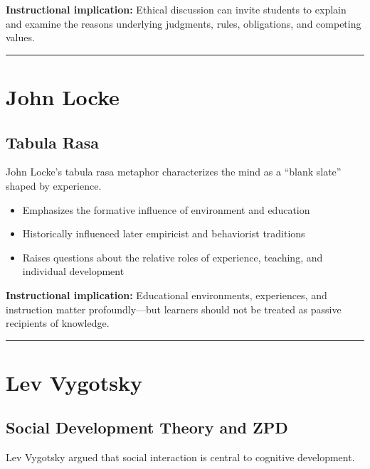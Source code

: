 \documentclass[
  letterpaper,
  DIV=11,
  numbers=noendperiod]{scrartcl}
\providecommand{\tightlist}{%
  \setlength{\itemsep}{0pt}\setlength{\parskip}{0pt}}\usepackage{longtable,booktabs,array}
\begin{document}
\textbf{Instructional implication:} Ethical discussion can invite
students to explain and examine the reasons underlying judgments, rules,
obligations, and competing values.

\begin{center}\rule{0.5\linewidth}{0.5pt}\end{center}

\section{John Locke}\label{john-locke}

\subsection{Tabula Rasa}\label{tabula-rasa}

John Locke's tabula rasa metaphor characterizes the mind as a ``blank
slate'' shaped by experience.

\begin{itemize}
\tightlist
\item
  Emphasizes the formative influence of environment and education
\item
  Historically influenced later empiricist and behaviorist traditions
\item
  Raises questions about the relative roles of experience, teaching, and
  individual development
\end{itemize}

\textbf{Instructional implication:} Educational environments,
experiences, and instruction matter profoundly---but learners should not
be treated as passive recipients of knowledge.

\begin{center}\rule{0.5\linewidth}{0.5pt}\end{center}

\section{Lev Vygotsky}\label{lev-vygotsky}

\subsection{Social Development Theory and
ZPD}\label{social-development-theory-and-zpd}

Lev Vygotsky argued that social interaction is central to cognitive
development.
\end{document}
